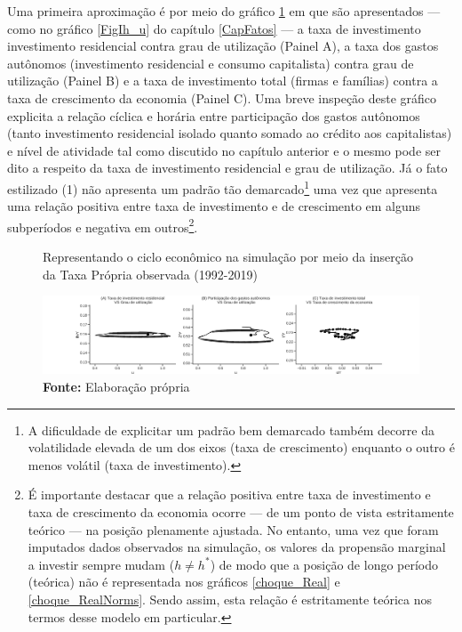 Uma primeira aproximação é por meio do gráfico \ref{clock_Real} em que são apresentados --- como no gráfico \ref{FigIh_u} do capítulo \ref{CapFatos} --- a taxa de investimento investimento residencial contra grau de utilização (Painel A), a taxa dos gastos autônomos (investimento residencial e consumo capitalista) contra grau de utilização (Painel B) e a taxa de investimento total (firmas e famílias) contra a taxa de crescimento da economia (Painel C).
Uma breve inspeção deste gráfico explicita a relação cíclica e horária entre participação dos gastos autônomos (tanto investimento residencial isolado quanto somado ao crédito aos capitalistas) e nível de atividade tal como discutido no capítulo anterior e o mesmo pode ser dito a respeito da taxa de investimento residencial e grau de utilização. Já o fato estilizado (1) não apresenta um padrão tão demarcado\footnote{A dificuldade de explicitar um padrão bem demarcado também decorre da volatilidade elevada de um dos eixos (taxa de crescimento) enquanto o outro é menos volátil (taxa de investimento).} uma vez que apresenta uma relação positiva entre taxa de investimento e de crescimento em alguns subperíodos e negativa em outros\footnote{
	É importante destacar que a relação positiva entre taxa de investimento e taxa de crescimento da economia ocorre --- de um ponto de vista estritamente teórico --- na posição plenamente ajustada. No entanto, uma vez que foram imputados dados observados na simulação, os valores da propensão marginal a investir sempre mudam ($h \neq h^*$) de modo que a posição de longo período (teórica) não é representada nos gráficos \ref{choque_Real} e \ref{choque_RealNorms}.
	Sendo assim, esta relação é estritamente teórica nos termos desse modelo em particular.
}.


\begin{figure}[H]
	\centering
	\caption{Representando o ciclo econômico na simulação por meio da inserção da Taxa Própria observada (1992-2019)}
	\label{clock_Real}
	\includegraphics[width=\textwidth]{../../Modelo/Versoes/Clock_Real.png}
	\caption*{\textbf{Fonte:} Elaboração própria}
\end{figure}

